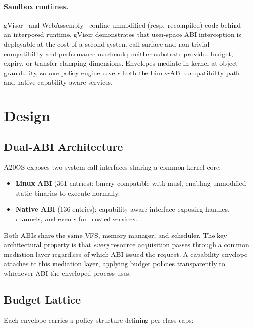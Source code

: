 \documentclass[letterpaper,twocolumn,10pt]{article}
\begin{document}
\paragraph{Sandbox runtimes.}
gVisor~\cite{gvisor2019} and WebAssembly~\cite{haas2017wasm} confine
unmodified (resp.~recompiled) code behind an interposed runtime.
gVisor demonstrates that user-space ABI interception is deployable at
the cost of a second system-call surface and non-trivial compatibility
and performance overheads; neither substrate provides budget, expiry,
or transfer-clamping dimensions.  Envelopes mediate in-kernel at
object granularity, so one policy engine covers both the Linux-ABI
compatibility path and native capability-aware services.

\section{Design}
\label{sec:design}

\subsection{Dual-ABI Architecture}

A20OS exposes two system-call interfaces sharing a common kernel core:

\begin{itemize}
\item \textbf{Linux ABI} (361 entries): binary-compatible with musl,
      enabling unmodified static binaries to execute normally.
\item \textbf{Native ABI} (136 entries): capability-aware interface
      exposing handles, channels, and events for trusted services.
\end{itemize}

Both ABIs share the same VFS, memory manager, and scheduler.  The key
architectural property is that \emph{every} resource acquisition passes
through a common mediation layer regardless of which ABI issued the
request.  A capability envelope attaches to this mediation layer,
applying budget policies transparently to whichever ABI the enveloped
process uses.

\subsection{Budget Lattice}

Each envelope carries a policy structure defining per-class caps:
\end{document}
